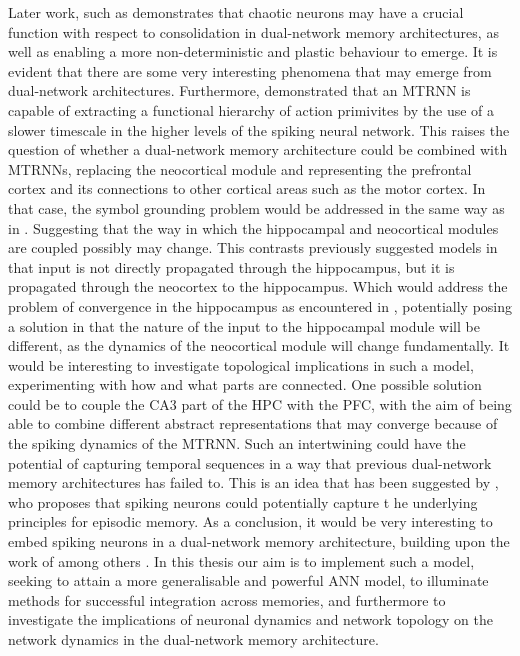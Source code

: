 Later work, such as \cite{Hattori2014} demonstrates that chaotic neurons may have a crucial function with respect to consolidation in dual-network memory architectures, as well as enabling a more non-deterministic and plastic behaviour to emerge. It is evident that there are some very interesting phenomena that may emerge from dual-network architectures. Furthermore, \cite{Tani2014} demonstrated that an MTRNN is capable of extracting a functional hierarchy of action primivites by the use of a slower timescale in the higher levels of the spiking neural network. This raises the question of whether a dual-network memory architecture could be combined with MTRNNs, replacing the neocortical module and representing the prefrontal cortex and its connections to other cortical areas such as the motor cortex. In that case, the symbol grounding problem would be addressed in the same way as in \cite{Tani2014}. Suggesting that the way in which the hippocampal and neocortical modules are coupled possibly may change. This contrasts previously suggested models in that input is not directly propagated through the hippocampus, but it is propagated through the neocortex to the hippocampus. Which would address the problem of convergence in the hippocampus as encountered in \cite{Ans1997, Ans2000, French2001}, potentially posing a solution in that the nature of the input to the hippocampal module will be different, as the dynamics of the neocortical module will change fundamentally. It would be interesting to investigate topological implications in such a model, experimenting with how and what parts are connected. One possible solution could be to couple the CA3 part of the HPC with the PFC, with the aim of being able to combine different abstract representations that may converge because of the spiking dynamics of the MTRNN. Such an intertwining could have the potential of capturing temporal sequences in a way that previous dual-network memory architectures has failed to. This is an idea that has been suggested by \cite{Hattori2014}, who proposes that spiking neurons could potentially capture t he underlying principles for episodic memory. As a conclusion, it would be very interesting to embed spiking neurons in a dual-network memory architecture, building upon the work of among others \cite{Yamashita2008, McClelland1995, Hattori2014}. In this thesis our aim is to implement such a model, seeking to attain a more generalisable and powerful ANN model, to illuminate methods for successful integration across memories, and furthermore to investigate the implications of neuronal dynamics and network topology on the network dynamics in the dual-network memory architecture.


\cleardoublepage